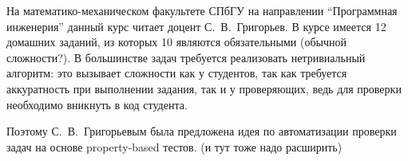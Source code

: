 На математико-механическом факультете СПбГУ на направлении \enquote{Программная инженерия} данный курс читает доцент С.~В.~Григорьев.
В курсе имеется 12 домашних заданий, из которых 10 являются обязательными (обычной сложности?).
В большинстве задач требуется реализовать нетривиальный алгоритм: это вызывает сложности как у студентов, так как требуется аккуратность при выполнении задания, так и у проверяющих, ведь для проверки необходимо вникнуть в код студента.

Поэтому С.~В.~Григорьевым была предложена идея по автоматизации проверки задач на основе property-based тестов. (и тут тоже надо расширить)
